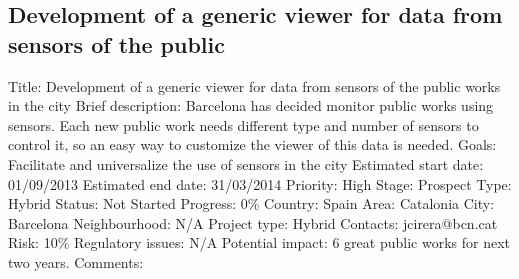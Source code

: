 \documentclass[draftclsnofoot,12pt,journal,onecolumn]{IEEEtran}
\begin{document}
\subsection{Development of a generic viewer for data from sensors of the public} 
Title: Development of a generic viewer for data from sensors of the public 
works in the city 
Brief description: Barcelona has decided monitor public works using sensors. 
Each new public work needs different type and number of sensors to control 
it, so an easy way to customize the viewer of this data is needed. 
Goals: Facilitate and universalize the use of sensors in the city 
Estimated start date: 01/09/2013 
Estimated end date: 31/03/2014 
Priority: High 
Stage: Prospect 
Type: Hybrid 
Status: Not Started 
Progress: 0\% 
Country: Spain 
Area: Catalonia 
City: Barcelona 
Neighbourhood: N/A 
Project type: Hybrid 
Contacts: jcirera@bcn.cat
Risk: 10\% 
Regulatory issues: N/A 
Potential impact: 6 great public works for next two years. 
Comments: 
\end{document}
